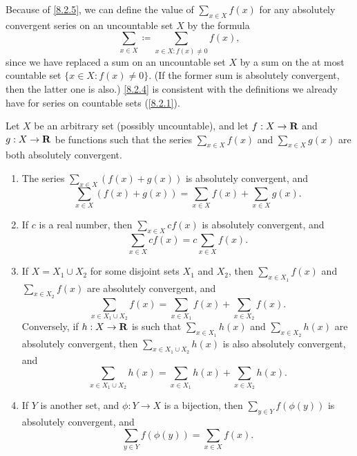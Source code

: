 \begin{note}
  Because of \cref{8.2.5}, we can define the value of \(\sum_{x \in X} f(x)\) for any absolutely convergent series on an uncountable set \(X\) by the formula
  \[
    \sum_{x \in X} \coloneqq \sum_{x \in X : f(x) \neq 0} f(x),
  \]
  since we have replaced a sum on an uncountable set \(X\) by a sum on the at most countable set \(\{x \in X : f(x) \neq 0\}\).
  (If the former sum is absolutely convergent, then the latter one is also.)
  \cref{8.2.4} is consistent with the definitions we already have for series on countable sets (\cref{8.2.1}).
\end{note}

\begin{proposition}\label{8.2.6}
  Let \(X\) be an arbitrary set (possibly uncountable), and let \(f : X \to \mathbf{R}\) and \(g : X \to \mathbf{R}\) be functions such that the series \(\sum_{x \in X} f(x)\) and \(\sum_{x \in X} g(x)\) are both absolutely convergent.
  \begin{enumerate}
    \item The series \(\sum_{x \in X} (f(x) + g(x))\) is absolutely convergent, and
          \[
            \sum_{x \in X} (f(x) + g(x)) = \sum_{x \in X} f(x) + \sum_{x \in X} g(x).
          \]
    \item If \(c\) is a real number, then \(\sum_{x \in X} cf(x)\) is absolutely convergent, and
          \[
            \sum_{x \in X} cf(x) = c \sum_{x \in X} f(x).
          \]
    \item If \(X = X_1 \cup X_2\) for some disjoint sets \(X_1\) and \(X_2\), then \(\sum_{x \in X_1} f(x)\) and \\
          \(\sum_{x \in X_2} f(x)\) are absolutely convergent, and
          \[
            \sum_{x \in X_1 \cup X_2} f(x) = \sum_{x \in X_1} f(x) + \sum_{x \in X_2} f(x).
          \]
          Conversely, if \(h : X \to \mathbf{R}\) is such that \(\sum_{x \in X_1} h(x)\) and \(\sum_{x \in X_2} h(x)\) are absolutely convergent, then \(\sum_{x \in X_1 \cup X_2} h(x)\) is also absolutely convergent, and
          \[
            \sum_{x \in X_1 \cup X_2} h(x) = \sum_{x \in X_1} h(x) + \sum_{x \in X_2} h(x).
          \]
    \item If \(Y\) is another set, and \(\phi : Y \to X\) is a bijection, then \(\sum_{y \in Y} f(\phi(y))\) is absolutely convergent, and
          \[
            \sum_{y \in Y} f(\phi(y)) = \sum_{x \in X} f(x).
          \]
  \end{enumerate}
\end{proposition}

